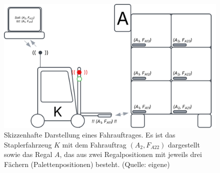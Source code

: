 \begin{figure}
    \centering
    \includegraphics[scale=0.6]{aufgabe 2/img/auftrag.svg}
    \caption{Skizzenhafte Darstellung eines Fahrauftrages. Es ist das Staplerfahrzeug $K$ mit dem Fahrauftrag $(A_2, F_{A22})$ dargestellt sowie das Regal $A$, das aus zwei Regalpositionen mit jeweils drei Fächern (Palettenpositionen) besteht.  (Quelle: eigene)}
    \label{fig:auftrag}
\end{figure}